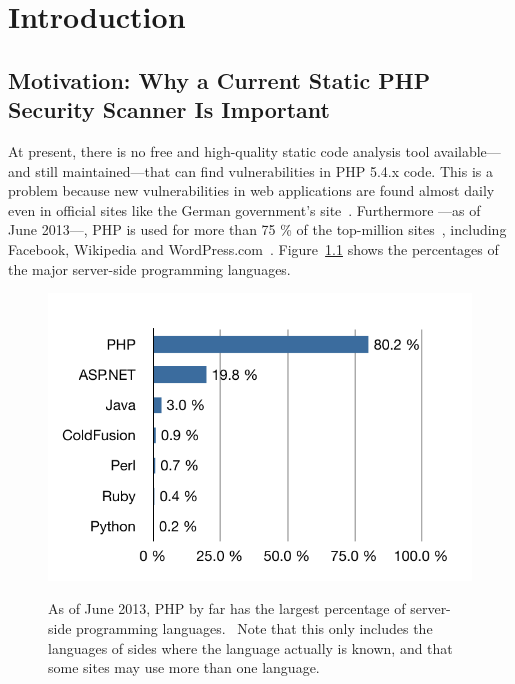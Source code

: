\chapter{Introduction}

\section{Motivation: Why a Current Static PHP Security Scanner Is Important}
At present, there is no free and high-quality static code analysis tool available---and still maintained---that can find vulnerabilities in PHP 5.4.x code. This is a problem because new vulnerabilities in web applications are found almost daily~\cite{osvdb} even in official sites like the German government's site~\cite{xss-bundesregierung}. Furthermore ---as of June 2013---, PHP is used for more than 75 \% of the top-million sites~\cite{w3techs-php-usage}, including Facebook, Wikipedia and WordPress.com~\cite{w3techs-php-sites}. Figure~\ref{fig:php-percentage} shows the percentages of the major server-side programming languages.

\begin{figure}[htb]
  \begin{center}
    \includegraphics[scale=1.0]{images/language-percentage}
    \caption{As of June 2013, PHP by far has the largest percentage of server-side programming languages.~\cite{w3techs-php-usage} Note that this only includes the languages of sides where the language actually is known, and that some sites may use more than one language.}
    \label{fig:php-percentage}
  \end{center}
\end{figure}


